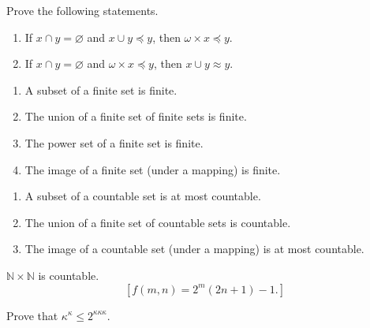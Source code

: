 \documentclass{ctexart}
\newif\ifpreface
\begin{document}
\large
\setlength{\baselineskip}{1.2em}
\ifpreface

\else
\maketitle
\fi
{}
\begin{problem}
Prove the following statements.
\begin{enumerate}
\item If $x \cap y=\varnothing$ and $x \cup y \preccurlyeq y$, then $\omega \times x \preccurlyeq y$.
\item If $x \cap y=\varnothing$ and $\omega \times x \preccurlyeq y$, then $x \cup y \approx y$.
\end{enumerate}
\end{problem}


\newcommand{\peq}{\preccurlyeq}
\newcommand{\set}{\mathbb{S}et}
\begin{problem}
\begin{enumerate}[ref=\theproblem.\arabic*]
\item\label{it:2.1} A subset of a finite set is finite.
\item\label{it:2.2} The union of a finite set of finite sets is finite.
\item The power set of a finite set is finite.
\item The image of a finite set (under a mapping) is finite.
\end{enumerate}
\end{problem}


\begin{problem}
\begin{enumerate}
\item A subset of a countable set is at most countable.
\item The union of a finite set of countable sets is countable.
\item The image of a countable set (under a mapping) is at most countable.
\end{enumerate}
\end{problem}



\begin{problem}
$\mathbb{N} \times \mathbb{N}$ is countable.
$$
\left[f(m, n)=2^m(2 n+1)-1 .\right]
$$
\end{problem}


\begin{problem}
Prove that $\kappa^\kappa \leq 2^{\kappa \kappa \kappa}$.
\end{problem}
\newcommand{\fun}[2]{^{#1}{#2}}
\end{document}
